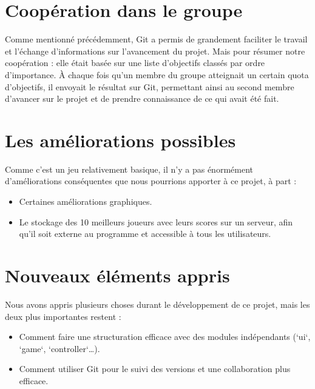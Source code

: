 \documentclass[a4paper, 11pt, oneside]{article}
\begin{document}
\section{Coopération dans le groupe}
Comme mentionné précédemment, Git a permis de grandement faciliter le travail et l’échange d’informations sur l’avancement du projet.
Mais pour résumer notre coopération : elle était basée sur une liste d’objectifs classés par ordre d’importance.
À chaque fois qu’un membre du groupe atteignait un certain quota d’objectifs, il envoyait le résultat sur Git, permettant ainsi au second membre d’avancer sur le projet et de prendre connaissance de ce qui avait été fait.

\section{Les améliorations possibles}
Comme c'est un jeu relativement basique, il n'y a pas énormément d'améliorations conséquentes que nous pourrions apporter à ce projet, à part :
\begin{itemize}
    \item Certaines améliorations graphiques.
    \item Le stockage des 10 meilleurs joueurs avec leurs scores sur un serveur, afin qu’il soit externe au programme et accessible à tous les utilisateurs.
\end{itemize}

\section{Nouveaux éléments appris}
Nous avons appris plusieurs choses durant le développement de ce projet, mais les deux plus importantes restent :
\begin{itemize}
    \item Comment faire une structuration efficace avec des modules indépendants (`ui`, `game`, `controller`…).
    \item Comment utiliser Git pour le suivi des versions et une collaboration plus efficace.
\end{itemize}
\end{document}
